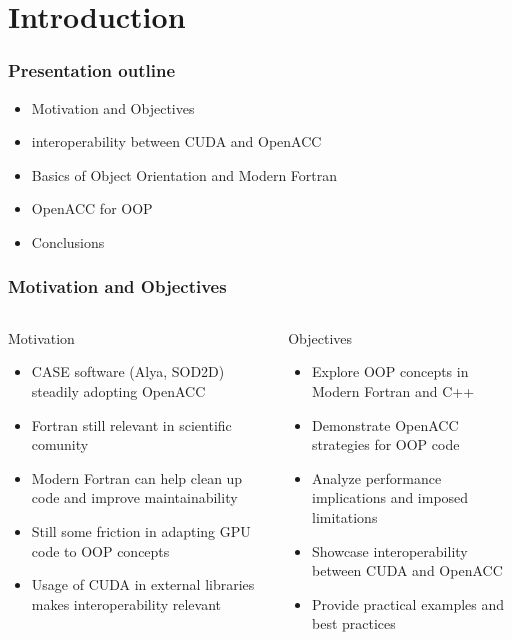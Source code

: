 \section{Introduction}

\begin{frame}
    \frametitle{Presentation outline}
    
    \begin{itemize}
        \item Motivation and Objectives
        \item interoperability between CUDA and OpenACC
        \item Basics of Object Orientation and Modern Fortran
        \item OpenACC for OOP
        \item Conclusions
    \end{itemize}
    
\end{frame}

\begin{frame}
	\frametitle{Motivation and Objectives}
	\begin{columns}
		\begin{block}{Motivation}
			\begin{itemize}
				\item CASE software (Alya, SOD2D) steadily adopting OpenACC
				\item Fortran still relevant in scientific comunity
				\item Modern Fortran can help clean up code and improve maintainability
				\item Still some friction in adapting GPU code to OOP concepts
				\item Usage of CUDA in external libraries makes interoperability relevant
			\end{itemize}
		\end{block}
		\begin{block}{Objectives}
			\begin{itemize}
				\item Explore OOP concepts in Modern Fortran and C++
				\item Demonstrate OpenACC strategies for OOP code
				\item Analyze performance implications and imposed limitations
				\item Showcase interoperability between CUDA and OpenACC
				\item Provide practical examples and best practices
			\end{itemize}
		\end{block}
	\end{columns}
\end{frame}

